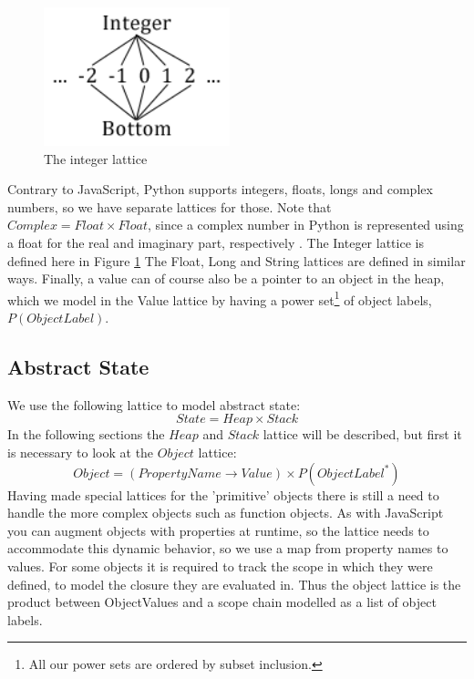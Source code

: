 \begin{figure}
	\vspace{-20pt}
	\begin{center}
		\includegraphics[width=0.48\textwidth]{images/integer-lattice.png}
	\end{center}
	\vspace{-10pt}
	\caption{The integer lattice}
	\label{fig:latticeInteger}
	\vspace{-10pt}
\end{figure}
Contrary to JavaScript, Python supports integers, floats, longs and complex numbers, so we have separate lattices for those. Note that $Complex = Float \times Float$, since a complex number in Python is represented using a float for the real and imaginary part, respectively \cite{pyref.stdtypes}. The Integer lattice is defined here in Figure \ref{fig:latticeInteger} The Float, Long and String lattices are defined in similar ways. Finally, a value can of course also be a pointer to an object in the heap, which we model in the Value lattice by having a power set\footnote{All our power sets are ordered by subset inclusion.} of object labels, $P(ObjectLabel)$.

\subsection{Abstract State}
We use the following lattice to model abstract state:
\begin{equation*}
State = Heap \times Stack
\end{equation*}
In the following sections the $Heap$ and $Stack$ lattice will be described, but first it is necessary to look at the $Object$ lattice:
\begin{equation*}
Object = (PropertyName \rightarrow Value) \times P(ObjectLabel^{*})
\end{equation*}
Having made special lattices for the 'primitive' objects there is still a need to handle the more complex objects such as function objects.
As with JavaScript you can augment objects with properties at runtime, so the lattice needs to accommodate this dynamic behavior, so
we use a map from property names to values. For some objects it is required to track the scope in which they were defined, to model the closure they are evaluated in.
Thus the object lattice is the product between ObjectValues and a scope chain modelled as a list of object labels.
